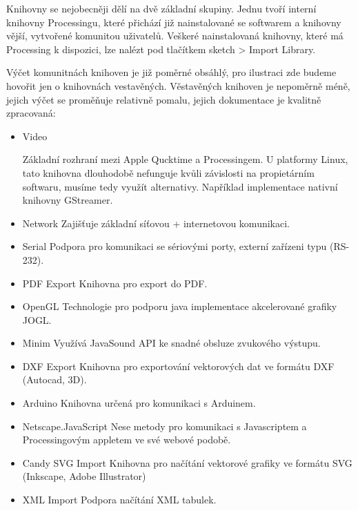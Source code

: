 \documentclass[10pt]{book}
\begin{document}
Knihovny se  nejobecněji dělí na dvě základní skupiny. Jednu tvoří interní knihovny Processingu, které přichází již nainstalované se softwarem a knihovny vější, vytvořené komunitou uživatelů. Veškeré nainstalovaná knihovny, které má Processing k dispozici, lze nalézt pod tlačítkem sketch > Import Library.


Výčet komunitnách knihoven je již poměrné obsáhlý, pro ilustraci zde budeme hovořit jen o knihovnách vestavěných. Věstavěných knihoven je nepoměrně méně, jejich výčet se proměňuje relativně pomalu, jejich dokumentace je kvalitně zpracovaná:


\begin{itemize}
\item
Video

Základní rozhraní mezi Apple Qucktime a Processingem. U platformy Linux, tato knihovna dlouhodobě nefunguje kvůli závislosti na propietárním softwaru, musíme tedy využít alternativy. Například implementace nativní knihovny GStreamer.

\item
Network
Zajišťuje základní síťovou + internetovou komunikaci. 

\item
Serial
Podpora pro komunikaci se sériovými porty, externí zařízeni typu (RS-232).

\item
PDF Export
Knihovna pro export do PDF.

\item
OpenGL
Technologie pro podporu java implementace akcelerované grafiky JOGL.

\item
Minim
Využívá JavaSound API ke snadné obsluze zvukového výstupu.

\item
DXF Export
Knihovna pro exportování vektorových dat ve formátu DXF (Autocad, 3D).

\item
Arduino
Knihovna určená pro komunikaci s Arduinem.

\item
Netscape.JavaScript
Nese metody pro komunikaci s Javascriptem a Processingovým appletem ve své webové podobě.

\item
Candy SVG Import
Knihovna pro načítání vektorové grafiky ve formátu SVG (Inkscape, Adobe Illustrator)

\item
XML Import
Podpora načítání XML tabulek.
\end{itemize}
\end{document}
